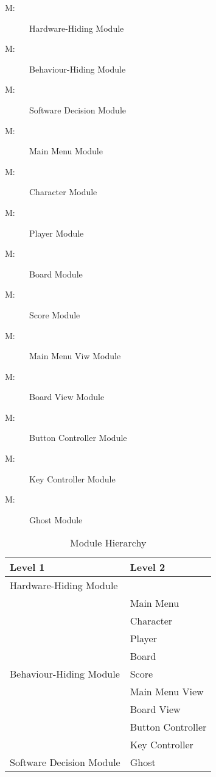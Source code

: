 \documentclass[12pt, titlepage]{article}
\newcounter{mnum}
\newcommand{\mthemnum}{M\themnum}
\begin{document}
\begin{description}
\item [ \mthemnum \label{mHH}:] Hardware-Hiding Module
\item [ \mthemnum \label{mBH}:] Behaviour-Hiding Module
\item [ \mthemnum \label{mSD}:] Software Decision Module
\item [ \mthemnum \label{mMM}:] Main Menu Module
\item [ \mthemnum \label{mC}:] Character Module
\item [ \mthemnum \label{mP}:] Player Module
\item [ \mthemnum \label{mB}:] Board Module
\item [ \mthemnum \label{mS}:] Score Module
\item [ \mthemnum \label{mMV}:] Main Menu Viw Module
\item [ \mthemnum \label{mBV}:] Board View Module
\item [ \mthemnum \label{mBC}:] Button Controller Module
\item [ \mthemnum \label{mKC}:] Key Controller Module
\item [ \mthemnum \label{mG}:] Ghost Module
\end{description}


\begin{table}[h!]
\centering
\begin{tabular}{p{} p{}}
\toprule
\textbf{Level 1} & \textbf{Level 2}\\
\midrule

{Hardware-Hiding Module} & ~ \\
\midrule

\multirow{9}{0.3\textwidth}{Behaviour-Hiding Module}
& Main Menu\\
& Character\\
& Player\\
& Board\\
& Score\\
& Main Menu View\\ 
& Board View\\
& Button Controller\\
& Key Controller\\
\midrule

{Software Decision Module} & Ghost\\
\bottomrule

\end{tabular}
\caption{Module Hierarchy}
\label{TblMH}
\end{table}
\end{document}
